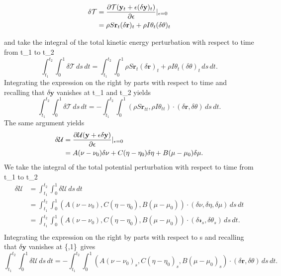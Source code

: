 \documentclass[12pt]{article}
\newcommand{\cB}{B}
\newcommand{\cA}{A}
\newcommand{\cC}{C}
\begin{document}
\begin{equation}
\begin{split}
 \delta\mathcal{T}& = \frac{\partial \mathcal{T}(\mathbf{y}_t + \epsilon (\delta \mathbf{y})_t )}{\partial{\epsilon}} \arrowvert_{\epsilon=0}\\
                  & = \rho S\mathbf{r}_t (\delta\mathbf{r})_t + \rho I \theta_t (\delta \theta)_t\\
\end{split}
\end{equation}

and take the integral of the total kinetic energy perturbation with respect to time from t_1 to t_2
\[\int_{t_1}^{t_2} \int_{0}^{1} \delta \mathcal{T}\, ds \, dt = \int_{t_1}^{t_2} \int_{0}^{1} \rho S\mathbf{r}_t (\delta\mathbf{r})_t + \rho I \theta_t (\delta \theta)_t\, ds \, dt.
\]
Integrating the expression on the right by parts with respect to time and recalling that $\delta\mathbf{y}$ vanishes at t_1 and t_2  yields
\[\int_{t_1}^{t_2}\int_{0}^{1}\delta \mathcal{T}\,ds\,dt = -\int_{t_1}^{t_2}\int_{0}^{1}(\rho S\mathbf{r}_{tt}, \rho I\theta_{tt})\cdot(\delta\mathbf{r},\delta\theta)\,ds\,dt.
\]
The same argument yields
\begin{equation}
\begin{split}
 \delta\mathcal{U}& = \frac{\partial \mathcal{U}(\mathbf{y} + \epsilon\delta\mathbf{y})}{\partial{\epsilon}} \arrowvert_{\epsilon=0}\\
                  & = \cA(\nu-\nu_{0})\delta\nu+\cC(\eta-\eta_0)\delta\eta+\cB(\mu-\mu_0)\delta\mu.\\
\end{split}
\end{equation}
We take the integral of the total potential perturbation with respect to time from t_1 to t_2
\begin{equation}
\begin{split}
 \delta\mathcal{U}& = \int_{t_1}^{t_2}\int_{0}^{1}\delta\mathcal{U}\,ds\,dt \\
                  & = \int_{t_1}^{t_2} \int_{0}^{1} 
(\cA(\nu-\nu_{0}),\cC(\eta-\eta_0),\cB(\mu-\mu_0))\cdot(\delta\nu,\delta\eta,\delta\mu)\,ds\,dt\\
                  & = \int_{t_1}^{t_2} \int_{0}^{1} 
(\cA(\nu-\nu_{0}),\cC(\eta-\eta_0),\cB(\mu-\mu_0))\cdot(\delta \mathcal{r}_s,\delta\theta_s)\,ds\,dt.\\
\end{split}
\end{equation}
Integrating the expression on the right by parts with respect to s and recalling that $\delta\mathbf{y}$ vanishes at \{\0,1\}\ gives
\[\int_{t_1}^{t_2}\int_{0}^{1}\delta\mathcal{U}\,ds\,dt =
-\int_{t_1}^{t_2} \int_{0}^{1} 
(\cA(\nu-\nu_{0})_s,\cC(\eta-\eta_0)_s,\cB(\mu-\mu_0)_s)\cdot(\delta\mathbf{r},\delta\theta)\,ds\,dt.
\]
\end{document}
